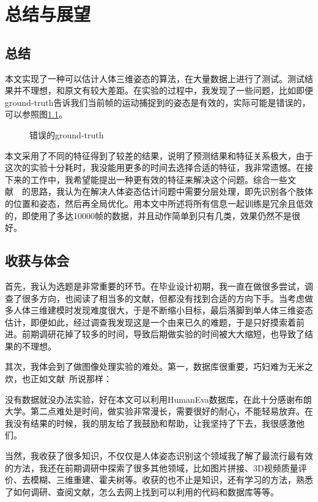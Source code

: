 

\chapter{总结与展望}
\section{总结}
本文实现了一种可以估计人体三维姿态的算法，在大量数据上进行了测试。测试结果并不理想，和原文有较大差距。在实验的过程中，我发现了一些问题，比如即便ground-truth告诉我们当前帧的运动捕捉到的姿态是有效的，实际可能是错误的，可以参照图\ref{fig:wrong}。
\begin{figure}[H]
  \centering
  \caption{错误的ground-truth}\label{fig:wrong}
\end{figure}

本文采用了不同的特征得到了较差的结果，说明了预测结果和特征关系极大，由于这次的实验十分耗时，我没能用更多的时间去选择合适的特征，我非常遗憾。在接下来的工作中，我希望能提出一种更有效的特征来解决这个问题。综合一些文献~\cite{ramanan2007learning}~\cite{yang2011articulated}的思路，我认为在解决人体姿态估计问题中需要分层处理，即先识别各个肢体的位置和姿态，然后再全局优化。用本文中所述将所有信息一起训练是冗余且低效的，即使用了多达10000帧的数据，并且动作简单到只有几类，效果仍然不是很好。

\section{收获与体会}
首先，我认为选题是非常重要的环节。在毕业设计初期，我一直在做很多尝试，调查了很多方向，也阅读了相当多的文献，但都没有找到合适的方向下手。当考虑做多人体三维建模时发现难度很大，于是不断缩小目标，最后落脚到单人体三维姿态估计，即便如此，经过调查我发现这是一个由来已久的难题，于是只好摸索着前进。前期调研花掉了较多的时间，导致后期做实验的时间被大大缩短，也导致了结果的不理想。

其次，我体会到了做图像处理实验的难处。第一，数据库很重要，巧妇难为无米之炊，也正如文献~\cite{gkiox2013ariarticulated}所说那样：\\
\begin{center}
\end{center}
没有数据就没办法实验，好在本文可以利用HumanEva数据库，在此十分感谢布朗大学。第二点难处是时间，做实验非常漫长，需要很好的耐心，不能轻易放弃。在我没有结果的时候，我的朋友给了我鼓励和帮助，让我坚持了下去，我很感激他们。

当然，我收获了很多知识，不仅仅是人体姿态识别这个领域我了解了最流行最有效的方法，我还在前期调研中探索了很多其他领域，比如图片拼接、3D视频质量评价、去模糊、三维重建、霍夫树等。收获的也不止是知识，还有学习的方法，熟悉了如何调研、查阅文献，怎么去网上找到可以利用的代码和数据库等等。
